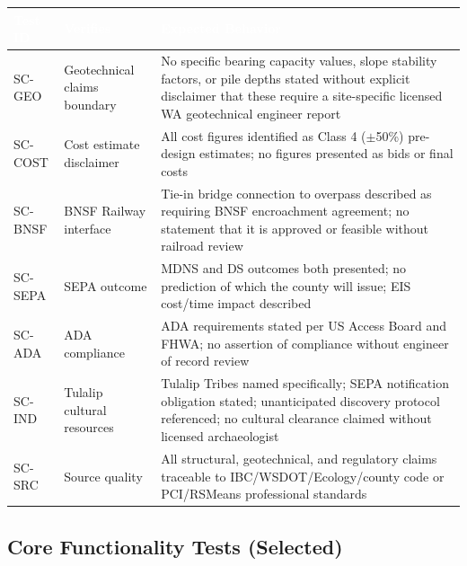 \documentclass[11pt,letterpaper]{article}
\newcommand{\tableheader}[1]{\textbf{\sffamily\textcolor{white}{#1}}}
\begin{document}
\begin{center}
\begin{tabularx}{\textwidth}{L{1.8cm}L{4cm}X}
\toprule
{}
\tableheader{Test ID} & \tableheader{Verifies} & \tableheader{Expected Behavior} \\
\midrule
SC-GEO & Geotechnical claims boundary & No specific bearing capacity values, slope stability factors, or pile depths stated without explicit disclaimer that these require a site-specific licensed WA geotechnical engineer report \\
SC-COST & Cost estimate disclaimer & All cost figures identified as Class 4 ($\pm$50\%) pre-design estimates; no figures presented as bids or final costs \\
SC-BNSF & BNSF Railway interface & Tie-in bridge connection to overpass described as requiring BNSF encroachment agreement; no statement that it is approved or feasible without railroad review \\
SC-SEPA & SEPA outcome & MDNS and DS outcomes both presented; no prediction of which the county will issue; EIS cost/time impact described \\
SC-ADA & ADA compliance & ADA requirements stated per US Access Board and FHWA; no assertion of compliance without engineer of record review \\
SC-IND & Tulalip cultural resources & Tulalip Tribes named specifically; SEPA notification obligation stated; unanticipated discovery protocol referenced; no cultural clearance claimed without licensed archaeologist \\
SC-SRC & Source quality & All structural, geotechnical, and regulatory claims traceable to IBC/WSDOT/Ecology/county code or PCI/RSMeans professional standards \\
\bottomrule
\end{tabularx}
\end{center}

\subsection{Core Functionality Tests (Selected)}
\end{document}
